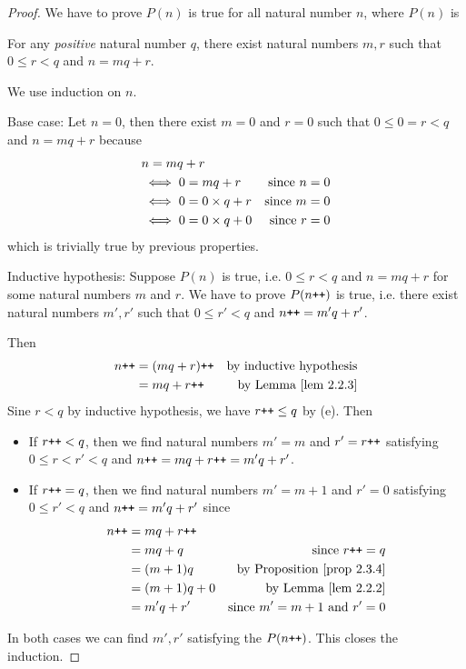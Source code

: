 \begin{proof}
We have to prove \(P(n)\) is true for all natural number \(n\), where \(P(n)\) is
\begin{center}
    For any \emph{positive} natural number \(q\), there exist natural numbers \(m, r\) such that \(0 \leq r < q\) and \(n = mq + r\).
\end{center}

We use induction on \(n\).

Base case: Let \(n = 0\), then there exist \(m = 0\) and \(r = 0\) such that \(0 \leq 0 = r < q\) and \(n = mq + r\) because
\begin{align*}
    & n = mq + r \\
    & \iff 0 = mq + r & \text{since \(n = 0\)} \\
    & \iff 0 = 0 \times q + r & \text{since \(m = 0\)} \\
    & \iff 0 = 0 \times q + 0 & \text{since \(r = 0\)} \\
\end{align*}
which is trivially true by previous properties.

Inductive hypothesis: Suppose \(P(n)\) is true, i.e. \(0 \leq r < q\) and \(n = mq + r\) for some natural numbers \(m\) and \(r\). We have to prove \(P(n\texttt{++})\) is true, i.e. there exist natural numbers \(m', r'\) such that \(0 \leq r' < q\) and \(n\texttt{++} = m'q + r'\).

Then
\begin{align*}
    n\INC & = (mq + r)\INC & \text{by inductive hypothesis} \\
          & = mq + r\INC   & \text{by \LEM{2.2.3}}
\end{align*}
Sine \(r < q\) by inductive hypothesis, we have \(r\texttt{++} \leq q\) by (e). Then
    \begin{itemize}
        \item If \(r\texttt{++} < q\), then we find natural numbers \(m' = m\) and \(r' = r\texttt{++}\) satisfying \(0 \leq r < r' < q\) and \(n\texttt{++} = mq + r\texttt{++} = m'q + r'\).
        \item If \(r\texttt{++} = q\), then we find natural numbers \(m' = m + 1\) and 
        \(r' = 0\) satisfying \(0 \leq r' < q\) and \(n\texttt{++} = m'q + r'\) since
        \begin{align*}
            n\INC & = mq + r\INC \\
                  & = mq + q     & \text{since \(r\INC = q\)} \\
                  & = (m + 1)q     & \text{by \PROP{2.3.4}} \\
                  & = (m + 1)q + 0 & \text{by \LEM{2.2.2}} \\
                  & = m'q + r'   & \text{since \(m' = m + 1\) and \(r' = 0\)}
        \end{align*}
    \end{itemize}
In both cases we can find \(m', r'\) satisfying the \(P(n\texttt{++})\). This closes the induction.
\end{proof}

